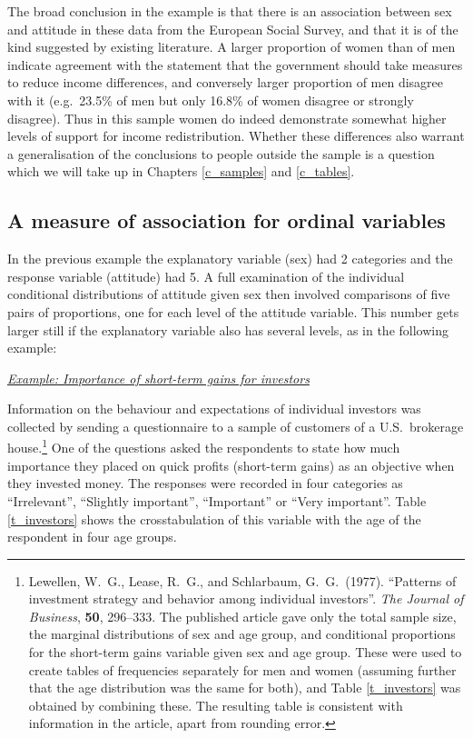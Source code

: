 The broad conclusion in the example is that there is an association
between sex and attitude in these data from the European Social Survey,
and that it is of the kind suggested by existing literature.
A larger proportion of women than of men indicate agreement with
the statement that the government should take measures to reduce income
differences, and conversely larger proportion of men disagree with it
(e.g.\ 23.5\% of men but only 16.8\% of women disagree or strongly
disagree). Thus in this sample women do indeed demonstrate somewhat
higher levels of support for income redistribution. Whether these
differences also warrant a generalisation of the conclusions to people
outside the sample is a question which we will take up in Chapters
\ref{c_samples} and \ref{c_tables}.

\subsection{A measure of association for ordinal variables}
\label{ss_descr1_2cat_gamma}

In the previous example the explanatory variable (sex) had 2 categories
and the response variable (attitude) had 5. A full examination of the
individual conditional distributions of attitude given sex then involved
comparisons of five pairs of proportions, one for each level of the
attitude variable. This number gets larger still if the explanatory
variable also has several levels, as in the following example:

\underline{\emph{Example: Importance of short-term gains
for investors}}

Information on the behaviour and expectations of individual investors
was collected by sending a questionnaire to a sample of
customers of a U.S.\ brokerage house.\footnote{Lewellen, W.\ G., Lease,
R.\ G., and Schlarbaum, G.\ G.\ (1977). ``Patterns of investment
strategy and behavior among individual investors''. \emph{The Journal of
Business}, \textbf{50}, 296--333. The
published article gave only the total sample size, the marginal
distributions of sex and age group, and conditional proportions for the
short-term gains variable given sex and age group. These were used to
create tables of frequencies
separately for men and women (assuming further that the age distribution was the
same for both), and Table \ref{t_investors} was obtained by combining
these. The resulting table is consistent with information in the article,
apart from rounding error.}
One of the questions asked the respondents to state how much importance
they placed on quick profits (short-term gains) as an objective when
they invested money. The responses were recorded in four categories as
``Irrelevant'', ``Slightly important'', ``Important'' or ``Very
important''. Table \ref{t_investors} shows the crosstabulation of this
variable with the age of the respondent in four age groups.


